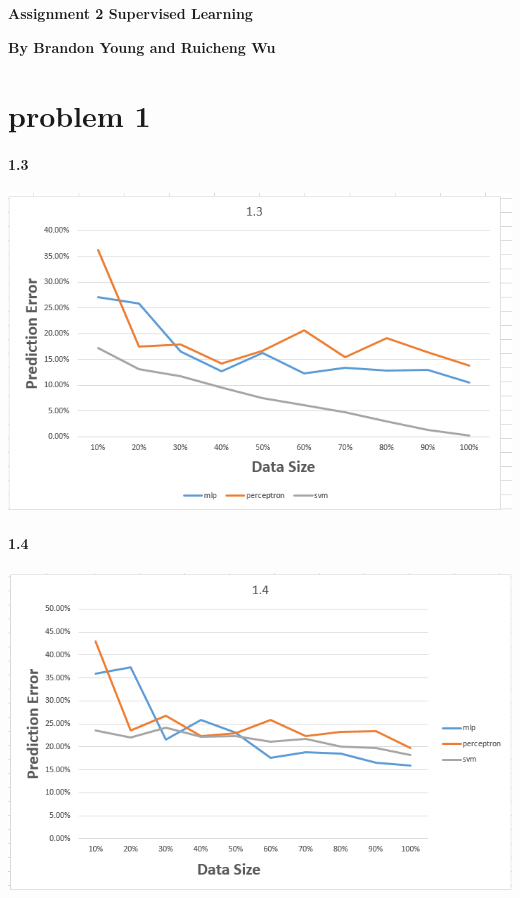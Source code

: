 \documentclass[12pt, letterpaper]{article}
\begin{document}
	\textbf{\large Assignment 2 Supervised Learning}\newline
	
	\textbf{By Brandon Young and Ruicheng Wu}
	\section{problem 1}
	
	\paragraph{1.3\newline}
	\includegraphics[scale=0.8]{"problem-1-3"}
	
	\paragraph{1.4\newline}
	\includegraphics[scale=0.8]{"problem-1-4"}
\end{document}
